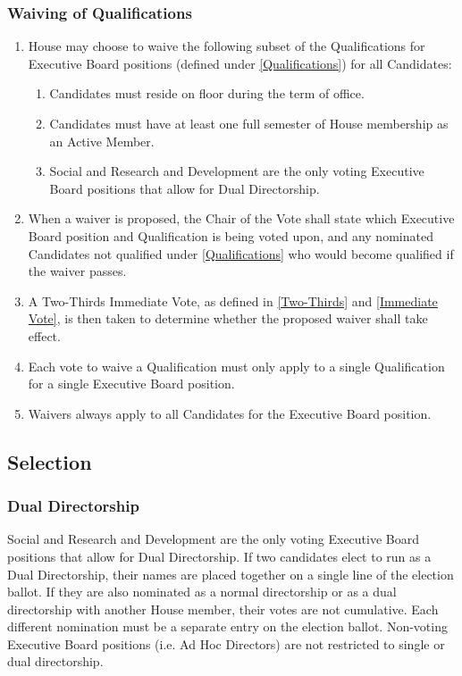 \documentclass{article}
\newcommand{\asection}[1]{\subsection{#1} \label{#1}}
\newcommand{\asubsection}[1]{\subsubsection{#1} \label{#1}}
\begin{document}
\asubsection{Waiving of Qualifications}
\begin{enumerate}
  \item House may choose to waive the following subset of the Qualifications for Executive Board positions (defined under \ref{Qualifications}) for all Candidates:
    \begin{enumerate}
      \item Candidates must reside on floor during the term of office.
      \item Candidates must have at least one full semester of House membership as an Active Member.
      \item Social and Research and Development are the only voting Executive Board positions that allow for Dual Directorship.
    \end{enumerate}
  \item When a waiver is proposed, the Chair of the Vote shall state which Executive Board position and Qualification is being voted upon, and any nominated Candidates not qualified under \ref{Qualifications} who would become qualified if the waiver passes.
  \item A Two-Thirds Immediate Vote, as defined in \ref{Two-Thirds} and \ref{Immediate Vote}, is then taken to determine whether the proposed waiver shall take effect.
  \item Each vote to waive a Qualification must only apply to a single Qualification for a single Executive Board position.
  \item Waivers always apply to all Candidates for the Executive Board position.
\end{enumerate}

\asection{Selection}
\asubsection{Dual Directorship}
Social and Research and Development are the only voting Executive Board positions that allow for Dual Directorship.
If two candidates elect to run as a Dual Directorship, their names are placed together on a single line of the election ballot.
If they are also nominated as a normal directorship or as a dual directorship with another House member, their votes are not cumulative.
Each different nomination must be a separate entry on the election ballot.
Non-voting Executive Board positions (i.e. Ad Hoc Directors) are not restricted to single or dual directorship.
\end{document}
